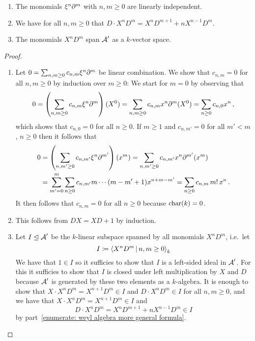 \begin{lemma}
  \label{lemma: preparation for weyl basis}
  \leavevmode
  \begin{enumerate}
    \item
      The monomials $\xi^n \partial^m$ with $n, m \geq 0$ are linearly independent.
    \item
      \label{enumerate: weyl algebra more general formula}
      We have for all $n, m \geq 0$ that $D \cdot X^n D^m = X^n D^{m+1} + n X^{n-1} D^m$.
    \item
      The monomials $X^n D^m$ span $\operatorname{\mathcal{A}}'$ as a $k$-vector space.
  \end{enumerate}
\end{lemma}


\begin{proof}
  \leavevmode
  \begin{enumerate}
    \item
      Let $0 = \sum_{n, m \geq 0} c_{n,m} \xi^n \partial^m$ be linear combination.
      We show that $c_{n,m} = 0$ for all $n, m \geq 0$ by induction over $m \geq 0$:
      We start for $m = 0$ by observing that
      \[
          0
        = \left( \sum_{n, m \geq 0} c_{n,m} \xi^n \partial^m \right)(X^0)
        = \sum_{n, m \geq 0} c_{n,m} x^n \partial^m(X^0)
        = \sum_{n \geq 0} c_{n,0} x^n \,,
      \]
      which shows that $c_{n,0} = 0$ for all $n \geq 0$.
      If $m \geq 1$ and $c_{n,m'} = 0$ for all $m' < m$, $n \geq 0$ then it follows that
      \begin{align*}
            0
        &=  \left( \sum_{n, m' \geq 0} c_{n,m'} \xi^n \partial^{m'} \right)(x^m)
         =  \sum_{n, m' \geq 0} c_{n,m'} x^n \partial^{m'}(x^m)
        \\
        &=  \sum_{m'=0}^m \sum_{n \geq 0} c_{n,m'} m \dotsm (m-m'+1) x^{n+m-m'}
         =  \sum_{n \geq 0} c_{n,m} \, m! \, x^n \,.
      \end{align*}
      It then follows that $c_{n,m} = 0$ for all $n \geq 0$ because $\operatorname{char}(k) = 0$.
    \item
      This follows from $DX = XD + 1$ by induction.
    \item
      Let $I \trianglelefteq \operatorname{\mathcal{A}}'$ be the $k$-linear subspace spanned by all monomials $X^n D^m$, i.e.\ let
      \[
                  I
        \defined  \gen{
                    X^n D^m
                  \suchthat
                    n, m \geq 0
                  }_k
      \]
      We have that $1 \in I$ so it sufficies to show that $I$ is a left-sided ideal in $\operatorname{\mathcal{A}}'$.
      For this it sufficies to show that $I$ is closed under left multiplication by $X$ and $D$ because $\operatorname{\mathcal{A}}'$ is generated by these two elements as a $k$-algebra.
      It is enough to show that $X \cdot X^n D^m = X^{n+1} D^m \in I$ and $D \cdot X^n D^m \in I$ for all $n, m \geq 0$, and we have that $X \cdot X^n D^m = X^{n+1} D^m \in I$ and
      \[
            D \cdot X^n D^m
        =   X^n D^{m+1} + n X^{n-1} D^m
        \in I
      \]
      by part~\ref*{enumerate: weyl algebra more general formula}.
    \qedhere
  \end{enumerate}
\end{proof}


